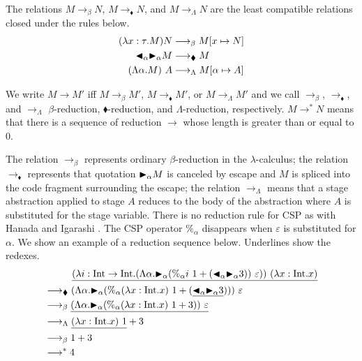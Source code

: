 \begin{definition}[Reduction]
    The relations $M \longrightarrow_\beta N$, $M \longrightarrow_\blacklozenge N$, and $M \longrightarrow_\Lambda N$
    are the least compatible relations closed under the rules below.
    \begin{align*}
         (\lambda x:\tau.M) N & \longrightarrow_\beta M[x \mapsto N]         \\
         {\mathop{\blacktriangleleft}}_\alpha {\mathop{\blacktriangleright}}_\alpha M & \longrightarrow_\blacklozenge M          \\
         (\Lambda \alpha.M)\ A & \longrightarrow_\Lambda M[\alpha \mapsto A]
    \end{align*}
\end{definition}
We write $ M \longrightarrow M'$ iff $ M \longrightarrow_\beta M'$,
$ M \longrightarrow_\blacklozenge M'$, or
$ M \longrightarrow_\Lambda M'$ and we call $\longrightarrow_\beta$,
$\longrightarrow_\blacklozenge$, and $\longrightarrow_\Lambda$
$\beta$-reduction, $\blacklozenge$-reduction, and $\Lambda$-reduction,
respectively.
$M \longrightarrow^* N$ means that there is a sequence of reduction $\longrightarrow$ whose length is greater than or equal to 0.

The relation $\longrightarrow_\beta$ represents ordinary $\beta$-reduction in the \(\lambda\)-calculus; the relation
$\longrightarrow_\blacklozenge$ represents that quotation ${\mathop{\blacktriangleright}}_\alpha M$ is canceled by escape and $M$ is spliced into the code fragment surrounding the escape;
the relation $\longrightarrow_\Lambda$ means that a stage abstraction applied to  stage $A$ reduces to the body of the abstraction
where $A$ is substituted for the stage variable.
There is no reduction rule for CSP as with Hanada and Igarashi \cite{Hanada2014}.
The CSP operator $\%_\alpha$ disappears when $\varepsilon$ is substituted for $\alpha$.
We show an example of a reduction sequence below.
Underlines show the redexes.
\begin{align*}
     & \hspace{10mm} \underline{(\lambda i:\I\to\I.(\Lambda\alpha.\TB_\alpha (\%_\alpha i\ 1 + (\TBL_\alpha \TB_\alpha 3))\ \varepsilon))\ (\lambda x:\I.x)} \\
     & \longrightarrow_\blacklozenge (\Lambda\alpha.\TB_\alpha (\%_\alpha (\lambda x:\I.x)\ 1 + (\underline{\TBL_\alpha \TB_\alpha 3})))\ \varepsilon        \\
     & \longrightarrow_\beta \underline{(\Lambda\alpha.\TB_\alpha (\%_\alpha (\lambda x:\I.x)\ 1 + 3))\ \varepsilon}                                         \\
     & \longrightarrow_\Lambda \underline{(\lambda x:\I.x)\ 1} + 3                                                                                           \\
     & \longrightarrow_\beta 1 + 3                                                                                                                           \\
     & \longrightarrow^* 4
\end{align*}

